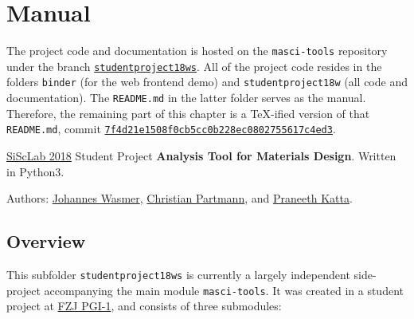
\chapter{Manual}
\label{cha:manual}

The project code and documentation is hosted on the \texttt{masci-tools}
repository \cite{masci-tools} under the branch
\href{https://github.com/JuDFTteam/masci-tools/tree/studentproject18ws}{\texttt{studentproject18ws}}.
All of the project code resides in the folders \texttt{binder} (for the web
frontend demo) and \texttt{studentproject18w} (all code and documentation). The
\texttt{README.md} in the latter folder serves as the manual. Therefore, the
remaining part of this chapter is a \TeX{}-ified version of that
\texttt{README.md}, commit
\href{https://github.com/JuDFTteam/masci-tools/tree/7f4d21e1508f0cb5cc0b228ec0802755617c4ed3
}{\texttt{7f4d21e1508f0cb5cc0b228ec0802755617c4ed3}}.

\vspace{3em}
\hdashrule{\textwidth}{2pt}{2pt}

\href{https://www.aices.rwth-aachen.de/en/academics/masters-program-simulation-sciences}{SiScLab
2018} Student Project \textbf{Analysis Tool for Materials
  Design}. Written in Python3.

Authors: \href{https://github.com/Irratzo}{Johannes Wasmer},
\href{https://github.com/ChristianPartmann}{Christian Partmann}, and
\href{https://github.com/PraneethKatta}{Praneeth Katta}.

\section{Overview}\label{overview}

This subfolder \texttt{studentproject18ws} is currently a largely
independent side-project accompanying the main module
\texttt{masci-tools}. It was created in a student project at \href{http://www.fz-juelich.de/pgi/pgi-1/EN/Home/home_node.html}{FZJ PGI-1}, and consists
of three submodules:

